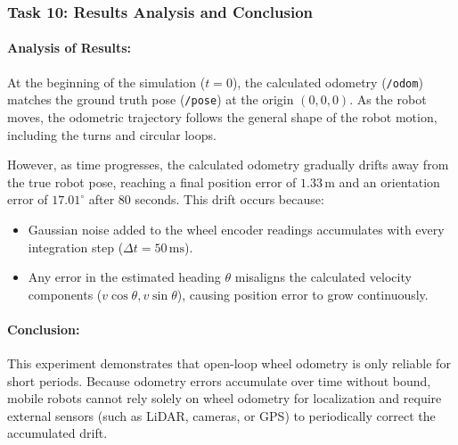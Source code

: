 \documentclass[11pt,a4paper]{article}
\begin{document}
\subsubsection*{Task 10: Results Analysis and Conclusion}
\paragraph{Analysis of Results:}
At the beginning of the simulation ($t = 0$), the calculated odometry (\texttt{/odom}) matches the ground truth pose (\texttt{/pose}) at the origin $(0, 0, 0)$. As the robot moves, the odometric trajectory follows the general shape of the robot motion, including the turns and circular loops.

However, as time progresses, the calculated odometry gradually drifts away from the true robot pose, reaching a final position error of $1.33\,\text{m}$ and an orientation error of $17.01^\circ$ after 80 seconds. This drift occurs because:
\begin{itemize}
  \item Gaussian noise added to the wheel encoder readings accumulates with every integration step ($\Delta t = 50\,\text{ms}$).
  \item Any error in the estimated heading $\theta$ misaligns the calculated velocity components ($v\cos\theta, v\sin\theta$), causing position error to grow continuously.
\end{itemize}

\paragraph{Conclusion:}
This experiment demonstrates that open-loop wheel odometry is only reliable for short periods. Because odometry errors accumulate over time without bound, mobile robots cannot rely solely on wheel odometry for localization and require external sensors (such as LiDAR, cameras, or GPS) to periodically correct the accumulated drift.
\end{document}
